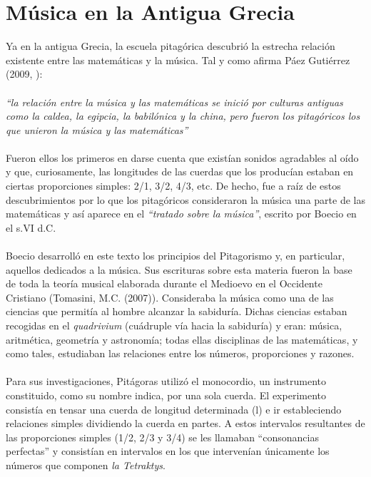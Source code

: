 \documentclass[a4paper, openright, 11pt, titlepage]{report}
\theoremstyle{definition}\newtheorem{defin}[propo]{Definition}
\theoremstyle{definition}\newtheorem{obser}[propo]{Remark}
\theoremstyle{definition}\newtheorem{ejem}[propo]{Ejemplo}
\theoremstyle{definition}\newtheorem{algoritmo}[propo]{Algoritmo}
\begin{document}
\chapter{Música en la Antigua Grecia}
Ya en la antigua Grecia, la escuela pitagórica descubrió la estrecha relación existente entre las matemáticas y la música. Tal y como afirma Páez Gutiérrez (2009, \cite{paez}):\\\\
\textit{``la relación entre la música y las matemáticas se inició por culturas antiguas como la caldea, la egipcia, la babilónica y la china, pero fueron los pitagóricos los que unieron la música y las matemáticas''}\\\\
Fueron ellos los primeros en darse cuenta que existían sonidos agradables al oído y que, curiosamente, las longitudes de las cuerdas que los producían estaban en ciertas proporciones simples: 2/1, 3/2, 4/3, etc. De hecho, fue a raíz de estos descubrimientos por lo que los pitagóricos consideraron la música una parte de las matemáticas y así aparece en el \textit{``tratado sobre la música''}, escrito por Boecio en el s.VI d.C.\\\\
Boecio desarrolló en este texto los principios del Pitagorismo y, en particular, aquellos dedicados a la música. Sus escrituras sobre esta materia fueron la base de toda la teoría musical elaborada durante el Medioevo en el Occidente Cristiano \cite{tomasini} (Tomasini, M.C. (2007)). Consideraba la música como una de las ciencias que permitía al hombre alcanzar la sabiduría. Dichas ciencias estaban recogidas en el \textit{quadrivium} (cuádruple vía hacia la sabiduría) y eran: música, aritmética, geometría y astronomía; todas ellas disciplinas de las matemáticas, y como tales, estudiaban las relaciones entre los números, proporciones y razones.\\\\
Para sus investigaciones, Pitágoras utilizó el monocordio, un instrumento constituido, como su nombre indica, por una sola cuerda. El experimento consistía en tensar una cuerda de longitud determinada (l) e ir estableciendo relaciones simples dividiendo la cuerda en partes. A estos intervalos resultantes de las proporciones simples (1/2, 2/3 y 3/4) se les llamaban ``consonancias perfectas'' y consistían en intervalos en los que intervenían únicamente los números que componen \textit{la Tetraktys}.\\\\
\end{document}
